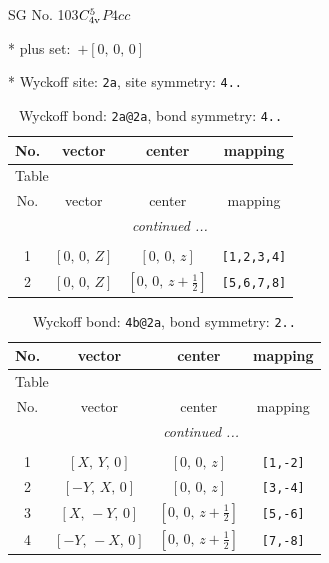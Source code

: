 \documentclass[fleqn,8pt]{jsarticle}
\begin{document}
\setcounter{MaxMatrixCols}{32}

\renewcommand{\tablename}{Table~}
\renewcommand{\figurename}{Figure~}
\begin{center}
\LARGE
SG No. 103\quad$C_{\rm 4v}^{5}$\quad$P4cc$\quad[ tetragonal ]
\end{center}

* plus set:\,\,\,$+\left[ 0,\, 0,\, 0 \right]$


* Wyckoff site: {\tt 2a}, site symmetry: {\tt 4..}
\renewcommand{\arraystretch}{1.2}
\begin{longtable}{cccc}
\caption{Wyckoff bond: {\tt 2a@2a}, bond symmetry: {\tt 4..}}
 \\
 \hline \hline
No. & vector & center & mapping \\ \hline \endfirsthead

\multicolumn{3}{l}{\tablename\ \thetable{}} \\
 \hline \hline
No. & vector & center & mapping \\ \hline \endhead

 \hline \hline
\multicolumn{3}{r}{\footnotesize\it continued ...} \\ \endfoot

 \hline \hline
\multicolumn{3}{r}{} \\ \endlastfoot

1 & $\left[ 0,\, 0,\, Z \right]$ & $\left[ 0,\, 0,\, z \right]$ & {\tt [1,2,3,4]} \\ \hline
2 & $\left[ 0,\, 0,\, Z \right]$ & $\left[ 0,\, 0,\, z + \frac{1}{2} \right]$ & {\tt [5,6,7,8]} \\
\end{longtable}
\renewcommand{\arraystretch}{1.2}
\begin{longtable}{cccc}
\caption{Wyckoff bond: {\tt 4b@2a}, bond symmetry: {\tt 2..}}
 \\
 \hline \hline
No. & vector & center & mapping \\ \hline \endfirsthead

\multicolumn{3}{l}{\tablename\ \thetable{}} \\
 \hline \hline
No. & vector & center & mapping \\ \hline \endhead

 \hline \hline
\multicolumn{3}{r}{\footnotesize\it continued ...} \\ \endfoot

 \hline \hline
\multicolumn{3}{r}{} \\ \endlastfoot

1 & $\left[ X,\, Y,\, 0 \right]$ & $\left[ 0,\, 0,\, z \right]$ & {\tt [1,-2]} \\ \hline
2 & $\left[ - Y,\, X,\, 0 \right]$ & $\left[ 0,\, 0,\, z \right]$ & {\tt [3,-4]} \\ \hline
3 & $\left[ X,\, - Y,\, 0 \right]$ & $\left[ 0,\, 0,\, z + \frac{1}{2} \right]$ & {\tt [5,-6]} \\ \hline
4 & $\left[ - Y,\, - X,\, 0 \right]$ & $\left[ 0,\, 0,\, z + \frac{1}{2} \right]$ & {\tt [7,-8]} \\
\end{longtable}
\end{document}
